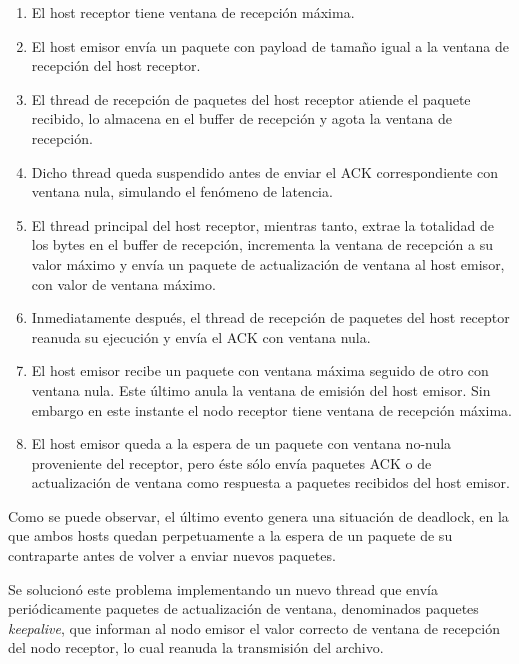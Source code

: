 \documentclass[a4paper, 10pt, twoside]{article}
\begin{document}
\begin{enumerate}
  \item El host receptor tiene ventana de recepción máxima.
  
  \item El host emisor envía un paquete con payload de tamaño igual a la ventana de recepción del host receptor.

  \item El thread de recepción de paquetes del host receptor atiende el paquete recibido, lo almacena en el buffer de recepción y agota la ventana de recepción.

  \item Dicho thread queda suspendido antes de enviar el ACK correspondiente con ventana nula, simulando el fenómeno de latencia.

  \item El thread principal del host receptor, mientras tanto, extrae la totalidad de los bytes en el buffer de recepción, incrementa la ventana de recepción a su valor máximo y envía un paquete de actualización de ventana al host emisor, con valor de ventana máximo.

  \item Inmediatamente después, el thread de recepción de paquetes del host receptor reanuda su ejecución y envía el ACK con ventana nula.

  \item El host emisor recibe un paquete con ventana máxima seguido de otro con ventana nula. Este último anula la ventana de emisión del host emisor. Sin embargo en este instante el nodo receptor tiene ventana de recepción máxima.

  \item El host emisor queda a la espera de un paquete con ventana no-nula proveniente del receptor, pero éste sólo envía paquetes ACK o de actualización de ventana como respuesta a paquetes recibidos del host emisor.
\end{enumerate}

Como se puede observar, el último evento genera una situación de deadlock, en la que ambos hosts quedan perpetuamente a la espera de un paquete de su contraparte antes de volver a enviar nuevos paquetes.

Se solucionó este problema implementando un nuevo thread que envía periódicamente paquetes de actualización de ventana, denominados paquetes \emph{keepalive}, que informan al nodo emisor el valor correcto de ventana de recepción del nodo receptor, lo cual reanuda la transmisión del archivo.
\end{document}
